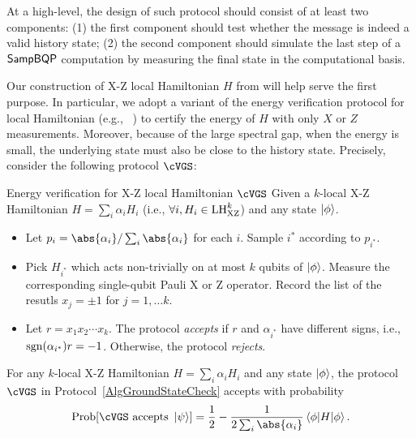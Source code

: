 At a high-level, the design of such protocol should consist of at least two components: (1) the first component should test whether the message is indeed a valid history state; (2) the second component should simulate the last step of a $\operatorname{\mathsf{SampBQP}}$ computation by measuring the final state in the computational basis. 

Our construction of X-Z local Hamiltonian $H$ from  will help serve the first purpose. 
In particular, we adopt a variant of the energy verification protocol for local Hamiltonian (e.g., ~\cite{mf16, PhysRevA.93.022326}) to certify the energy of $H$ with only $X$ or $Z$ measurements.
Moreover, because of the large spectral gap, when the energy is small, the underlying state must also be close to the history state. 
Precisely, consider the following protocol $\cVGS$: 

\begin{protocol}{Energy verification for X-Z local Hamiltonian $\cVGS$} \label{AlgGroundStateCheck}
Given a $k$-local X-Z Hamiltonian 
$H=\sum_i \alpha_{i} H_i$ (i.e., $\forall i, H_i \in \mathrm{LH}_{\mathrm{XZ}}^{k}$) and any state $\ket{\phi}$.

\begin{itemize}
\item Let $p_i= \abs{\alpha_i}/\sum_i \abs{\alpha_i}$ for each $i$. Sample $i^*$ according to $p_{i^*}$. 
\item Pick $H_{i^*}$ which acts non-trivially on at most $k$ qubits of $\ket{\phi}$. Measure the corresponding single-qubit Pauli X or Z operator. 
Record the list of the resutls $x_j=\pm 1$ for $j=1, \ldots k$. 
\item Let $r=x_1x_2\cdots x_k$. The protocol \emph{accepts} if $r$ and $\alpha_{i^*}$ have different signs, i.e., $\operatorname{sgn}(\alpha_{i^*})r=-1$. Otherwise, the protocol \emph{rejects}. 
\end{itemize}
\end{protocol}

\begin{lem}
	\label{thm:HamCheck}
	For any $k$-local X-Z Hamiltonian $H=\sum_i \alpha_{i} H_i$ and any state $\ket{\phi}$, 
	the protocol $\cVGS$ in Protocol~\ref{AlgGroundStateCheck} accepts with 
	probability
\begin{equation}
 \mathrm{Prob}[ \cVGS \text{ accepts } \ket{\psi}] = \frac{1}{2} - \frac{1}{2 \sum_i \abs{\alpha_i}}\braket{\phi|H|\phi}.
\end{equation}
\end{lem}


